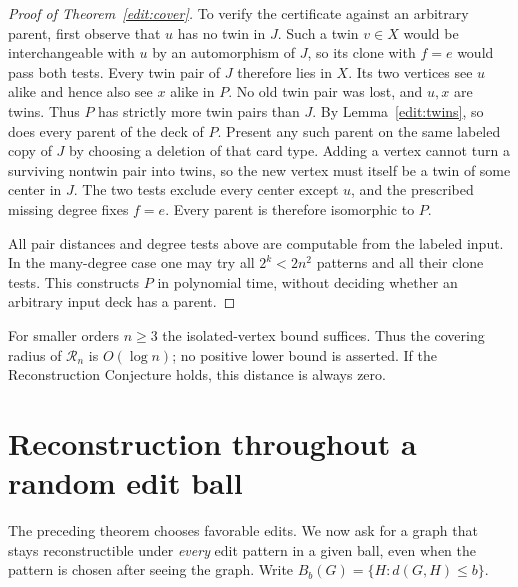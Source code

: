 \begin{proof}[Proof of Theorem~\ref{edit:cover}]
To verify the certificate against an arbitrary parent, first observe that
$u$ has no twin in $J$. Such a twin $v\in X$ would be interchangeable
with $u$ by an automorphism of $J$, so its clone with $f=e$ would pass
both tests. Every twin pair of $J$ therefore lies in $X$. Its two
vertices see $u$ alike and hence also see $x$ alike in $P$. No old twin
pair was lost, and $u,x$ are twins. Thus $P$ has strictly more twin pairs
than $J$. By Lemma~\ref{edit:twins}, so does every parent of the deck
of $P$. Present any such parent on the same labeled copy of $J$ by
choosing a deletion of that card type. Adding a vertex cannot turn a
surviving nontwin pair into twins, so the new vertex must itself be
a twin of some center in $J$. The two tests exclude every center except
$u$, and the prescribed missing degree fixes $f=e$. Every parent is
therefore isomorphic to $P$.

All pair distances and degree tests above are computable from the
labeled input. In the many-degree case one may try all $2^k<2n^2$
patterns and all their clone tests. This constructs $P$ in polynomial
time, without deciding whether an arbitrary input deck has a parent.
\end{proof}

For smaller orders $n\ge3$ the isolated-vertex bound suffices. Thus the
covering radius of $\mathcal R_n$ is $O(\log n)$; no positive lower
bound is asserted. If the Reconstruction Conjecture holds, this
distance is always zero.

\section{Reconstruction throughout a random edit ball}\label{edit:random}
The preceding theorem chooses favorable edits. We now ask for a graph
that stays reconstructible under \emph{every} edit pattern in a given
ball, even when the pattern is chosen after seeing the graph. Write
$B_b(G)=\{H:d(G,H)\le b\}$.

